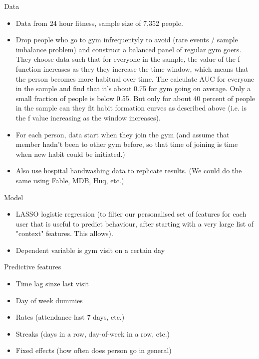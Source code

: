 \documentclass[a4paper, 11pt]{report}
\begin{document}
Data
\begin{itemize}
    \item Data from 24 hour fitness, sample size of 7,352 people.

    \item Drop people who go to gym infrequentyly to avoid (rare events / sample
        imbalance problem) and construct a balanced panel of regular gym goers.
        They choose data such that for everyone in the sample, the value of the
        f function increases as they they increase the time window, which means
        that the person becomes more habitual over time. The calculate AUC for
        everyone in the sample and find that it's about 0.75 for gym going on
        average. Only a small fraction of people is below 0.55. But only for
        about 40 percent of people in the sample can they fit habit formation
        curves as described above (i.e. is the f value increasing as the window
        increases).
    
    \item For each person, data start when they join the gym (and assume that
        member hadn't been to other gym before, so that time of joining is time
        when new habit could be initiated.)

    \item Also use hospital handwashing data to replicate results. (We could do
        the same using Fable, MDB, Huq, etc.)
\end{itemize}

Model
\begin{itemize}
    \item LASSO logistic regression (to filter our personalised set of features
        for each user that is useful to predict behaviour, after starting with a
        very large list of "context" features. This allows). 

    \item Dependent variable is gym visit on a certain day
\end{itemize}

Predictive features
\begin{itemize}
    \item Time lag sinze last visit
    \item Day of week dummies
    \item Rates (attendance last 7 days, etc.)
    \item Streaks (days in a row, day-of-week in a row, etc.)
    \item Fixed effects (how often does person go in general)
\end{itemize}
\end{document}
